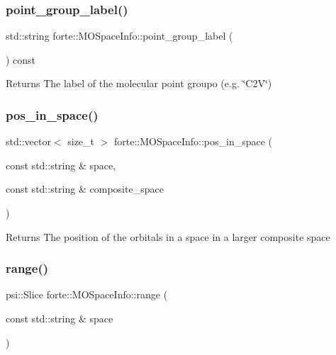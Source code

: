 \subsubsection{\texorpdfstring{point\+\_\+group\+\_\+label()}{point\_group\_label()}}
{\footnotesize\ttfamily std\+::string forte\+::\+M\+O\+Space\+Info\+::point\+\_\+group\+\_\+label (\begin{DoxyParamCaption}{ }\end{DoxyParamCaption}) const\hspace{0.3cm}{\ttfamily [inline]}}

\begin{DoxyReturn}{Returns}
The label of the molecular point groupo (e.\+g. \char`\"{}\+C2\+V\char`\"{}) 
\end{DoxyReturn}
\mbox{\label{classforte_1_1_m_o_space_info_abd10f6754af5b1f8dfeb50307c5756d5}} 
\subsubsection{\texorpdfstring{pos\+\_\+in\+\_\+space()}{pos\_in\_space()}}
{\footnotesize\ttfamily std\+::vector$<$ size\+\_\+t $>$ forte\+::\+M\+O\+Space\+Info\+::pos\+\_\+in\+\_\+space (\begin{DoxyParamCaption}\item[{const std\+::string \&}]{space,  }\item[{const std\+::string \&}]{composite\+\_\+space }\end{DoxyParamCaption})}

\begin{DoxyReturn}{Returns}
The position of the orbitals in a space in a larger composite space 
\end{DoxyReturn}
\mbox{\label{classforte_1_1_m_o_space_info_aefa3be2af6a786b5b573f9f3130ed1fa}} 
\subsubsection{\texorpdfstring{range()}{range()}}
{\footnotesize\ttfamily psi\+::\+Slice forte\+::\+M\+O\+Space\+Info\+::range (\begin{DoxyParamCaption}\item[{const std\+::string \&}]{space }\end{DoxyParamCaption})}

